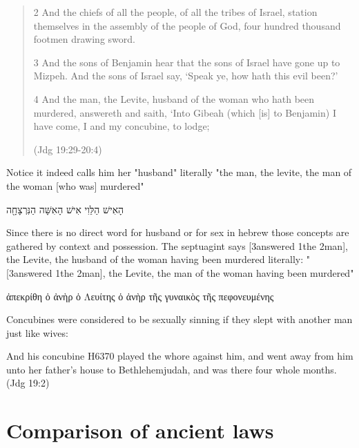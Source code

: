 \documentclass[11pt]{article}
\begin{document}
{\begin{quote}
2 And the chiefs of all the people, of all the tribes of Israel, station themselves in the assembly of the people of God, four hundred thousand footmen drawing sword.

3 And the sons of Benjamin hear that the sons of Israel have gone up to Mizpeh. And the sons of Israel say, `Speak ye, how hath this evil been?'

4 And the man, the Levite, husband of the woman who hath been murdered, answereth and saith, `Into Gibeah (which [is] to Benjamin) I have come, I and my concubine, to lodge;

 (Jdg 19:29-20:4)
\end{quote}

Notice it indeed calls him her "husband" literally "the man, the levite, the man of the woman [who was] murdered"
\begin{hebrew}
הָאִישׁ הַלֵּוִי אִישׁ הָאִשָּׁה הַנִּרְצָחָ֖ה

\end{hebrew}
Since there is no direct word for husband or for sex in hebrew those concepts are gathered by context and possession. The septuagint says [3answered 1the 2man], the Levite, the husband of the woman having been murdered
literally: "[3answered 1the 2man], the Levite, the man of the woman having been murdered"

\begin{greek}
 ἀπεκρίθη ὁ ἀνὴρ ὁ Λευίτης ὁ ἀνὴρ τῆς γυναικὸς τῆς πεφονευμένης
\end{greek}


Concubines were considered to be sexually sinning if they slept with another man just like wives:

And his concubine H6370 played the whore against him, and went away from him unto her father's house to Bethlehemjudah, and was there four whole months. (Jdg 19:2)


\section{Comparison of ancient laws}


}
\end{document}

